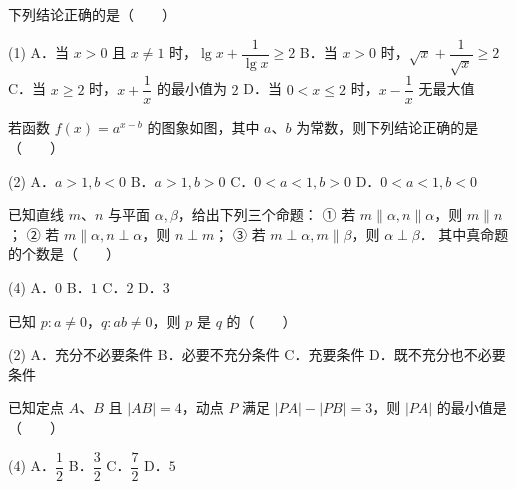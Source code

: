 \begin{question}
下列结论正确的是\mbox{（　　）}

\begin{gkopts}(1)
\task A．当 $x > 0$ 且 $x \neq 1$ 时，$\lg x + \dfrac{1}{\lg x} \geqslant 2$
\task B．当 $x > 0$ 时，$\sqrt{x} + \dfrac{1}{\sqrt{x}} \geqslant 2$
\task C．当 $x \geqslant 2$ 时，$x + \dfrac{1}{x}$ 的最小值为 $2$
\task D．当 $0 < x \leqslant 2$ 时，$x - \dfrac{1}{x}$ 无最大值
\end{gkopts}

\Needspace{0.4\textheight}
\end{question}
\begin{question}
若函数 $f(x) = a^{x-b}$ 的图象如图，其中 $a$、$b$ 为常数，则下列结论正确的是\mbox{（　　）}
\nopagebreak[4]
\begin{center}\end{center}
\nopagebreak[4]
\begin{gkopts}(2)
\task A．$a > 1, b < 0$
\task B．$a > 1, b > 0$
\task C．$0 < a < 1, b > 0$
\task D．$0 < a < 1, b < 0$
\end{gkopts}

\end{question}
\begin{question}
已知直线 $m$、$n$ 与平面 $\alpha, \beta$，给出下列三个命题：
① 若 $m \parallel \alpha, n \parallel \alpha$，则 $m \parallel n$；
② 若 $m \parallel \alpha, n \perp \alpha$，则 $n \perp m$；
③ 若 $m \perp \alpha, m \parallel \beta$，则 $\alpha \perp \beta$．
其中真命题的个数是\mbox{（　　）}

\begin{gkopts}(4)
\task A．$0$
\task B．$1$
\task C．$2$
\task D．$3$
\end{gkopts}

\end{question}
\begin{question}
已知 $p: a \neq 0$，$q: ab \neq 0$，则 $p$ 是 $q$ 的\mbox{（　　）}

\begin{gkopts}(2)
\task A．充分不必要条件
\task B．必要不充分条件
\task C．充要条件
\task D．既不充分也不必要条件
\end{gkopts}

\end{question}
\begin{question}
已知定点 $A$、$B$ 且 $|AB| = 4$，动点 $P$ 满足 $|PA| - |PB| = 3$，则 $|PA|$ 的最小值是\mbox{（　　）}

\begin{gkopts}(4)
\task A．$\dfrac{1}{2}$
\task B．$\dfrac{3}{2}$
\task C．$\dfrac{7}{2}$
\task D．$5$
\end{gkopts}

\end{question}
